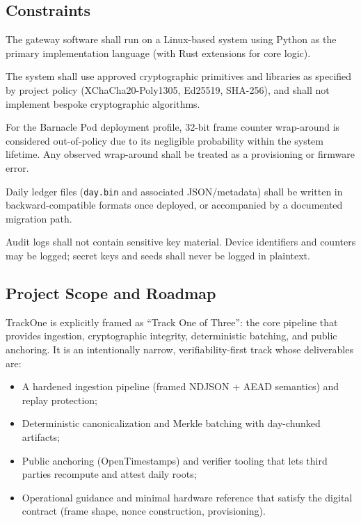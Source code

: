 \subsection{Constraints}
\label{subsec:constraints}

\begin{description}[style=nextline]
  \item[C-1 Platform] The gateway software shall run on a Linux-based system using Python as the primary implementation language (with Rust extensions for core logic).

  \item[C-2 Cryptography] The system shall use approved cryptographic primitives and libraries as specified by project policy (XChaCha20-Poly1305, Ed25519, \ac{SHA}-256), and shall not implement bespoke cryptographic algorithms.

  \item[C-3 Counter wrap-around] For the Barnacle Pod deployment profile, 32-bit frame counter wrap-around is considered out-of-policy due to its negligible probability within the system lifetime.
  Any observed wrap-around shall be treated as a provisioning or firmware error.

  \item[C-4 Storage format] Daily ledger files (\texttt{day.bin} and associated \ac{JSON}/metadata) shall be written in backward-compatible formats once deployed, or accompanied by a documented migration path.

  \item[C-5 Logging and privacy] Audit logs shall not contain sensitive key material.
  Device identifiers and counters may be logged; secret keys and seeds shall never be logged in plaintext.
\end{description}

\subsection{Project Scope and Roadmap}\label{subsec:project-scope-and-roadmap}
TrackOne is explicitly framed as ``Track One of Three'': the core pipeline that provides ingestion, cryptographic integrity, deterministic batching, and public anchoring.
It is an intentionally narrow, verifiability-first track whose deliverables are:
\begin{itemize}[nosep]
  \item A hardened ingestion pipeline (framed ND\ac{JSON} + \ac{AEAD} semantics) and replay protection;
  \item Deterministic canonicalization and Merkle batching with day-chunked artifacts;
  \item Public anchoring (OpenTimestamps) and verifier tooling that lets third parties recompute and attest daily roots;
  \item Operational guidance and minimal hardware reference that satisfy the digital contract (frame shape, nonce construction, provisioning).
\end{itemize}

